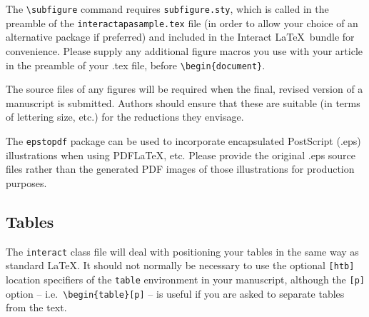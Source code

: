 \documentclass[]{interact}
\theoremstyle{plain}%
\theoremstyle{definition}
\theoremstyle{remark}
\begin{document}
The \verb"\subfigure" command requires \verb"subfigure.sty", which is called in the preamble of the \texttt{interactapasample.tex} file (in order to allow your choice of an alternative package if preferred) and included in the \textsf{Interact} \LaTeX\ bundle for convenience. Please supply any additional figure macros you use with your article in the preamble of your .tex file, before \verb"\begin{document}".

The source files of any figures will be required when the final, revised version of a manuscript is submitted. Authors should ensure that these are suitable (in terms of lettering size, etc.) for the reductions they envisage.

The \texttt{epstopdf} package can be used to incorporate encapsulated PostScript (.eps) illustrations when using PDF\LaTeX, etc. Please provide the original .eps source files rather than the generated PDF images of those illustrations for production purposes.


\subsection{Tables}

The \texttt{interact} class file will deal with positioning your tables in the same way as standard \LaTeX. It should not normally be necessary to use the optional \texttt{[htb]} location specifiers of the \texttt{table} environment in your manuscript, although the \texttt{[p]} option -- i.e.\ \verb"\begin{table}[p]" -- is useful if you are asked to separate tables from the text.
\end{document}
